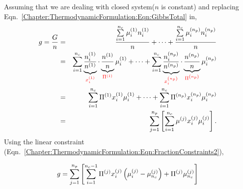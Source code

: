 Assuming that we are dealing with closed system(\ie $n$ is constant) and replacing Eqn.~\ref{Chapter:ThermodynamicFormulation:Eqn:GibbsTotal} in,
\begin{eqnarray}
     g = \frc{G}{n} &=& \frc{\summation_{i=1}^{n_{c}}\mfr[\mu]{i}{1}\mfr[n]{i}{1}}{n} +  \cdots +  \frc{\summation_{i=1}^{n_{c}}\mfr[\mu]{i}{n_{p}}\mfr[n]{i}{n_{p}}}{n} \nonumber \\
       &=& \summation_{i=1}^{n_{c}} \underbrace{\frc{\mfr[n]{i}{1}}{\mfr[n]{}{1}}}_{\red{\mfr[x]{i}{1}}} \cdot\underbrace{\frc{\mfr[n]{}{1}}{n}}_{\red{\mfr[\Pi]{}{1}}}\mfr[\mu]{i}{1} + \cdots + \summation_{i=1}^{n_{c}} \underbrace{\frc{\mfr[n]{i}{n_{p}}}{\mfr[n]{}{n_{p}}}}_{\red{\mfr[x]{i}{n_{p}}}} \cdot\underbrace{\frc{\mfr[n]{}{n_{p}}}{n}}_{\red{\mfr[\Pi]{}{n_{p}}}}\mfr[\mu]{i}{n_{p}} \nonumber \\
      &=& \summation_{i=1}^{n_{c}} \mfr[\Pi]{}{1}\mfr[x]{i}{1}\mfr[\mu]{i}{1} + \cdots + \summation_{i=1}^{n_{c}} \mfr[\Pi]{}{n_{p}}\mfr[x]{i}{n_{p}}\mfr[\mu]{i}{n_{p}} \nonumber \\
      &=& \summation_{j=1}^{n_{p}}\left[\summation_{i=1}^{n_{c}} \mfr[\mu]{}{j}\mfr[x]{i}{j}\mfr[\mu]{i}{j}\right].
\end{eqnarray}
Using the linear constraint (Eqn.~\ref{Chapter:ThermodynamicFormulation:Eqn:FractionConstraints2}),
\begin{shaded}\noindent
   \begin{equation}
      g = \summation_{j=1}^{n_{p}}\left[\summation_{i=1}^{n_{c}-1} \mfr[\Pi]{}{j}\mfr[x]{i}{j}\left(\mfr[\mu]{i}{j}-\mfr[\mu]{n_{c}}{j}\right) + \mfr[\Pi]{}{j}\mfr[\mu]{n_{c}}{j}\right]\label{Chapter:ThermodynamicFormulation:Eqn:GibbsMolar1}
   \end{equation}
\end{shaded}

